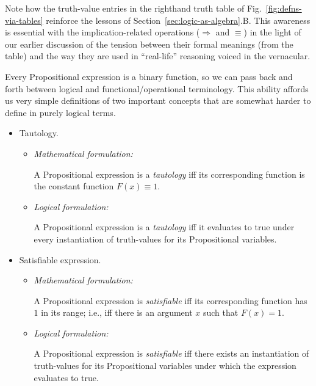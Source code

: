 Note how the truth-value entries in the righthand truth table of Fig.~\ref{fig:defns-via-tables} reinforce the lessons of Section~\ref{sec:logic-as-algebra}.B.  This awareness is essential with the implication-related operations ($\Rightarrow$ and $\equiv$) in the light of our earlier discussion of the tension between their formal meanings (from the table) and the way they are
used in ``real-life'' reasoning voiced in the vernacular.

\medskip

 
Every Propositional expression is a binary function, so we can pass back and forth between logical and functional/operational terminology.  This ability affords us very simple definitions of two important concepts that are somewhat harder to define in purely logical terms.
\begin{itemize}
\item
{\sf Tautology}. 
  \begin{itemize}
  \item
{\it Mathematical formulation:}

\smallskip

A Propositional expression is a {\it tautology} iff its corresponding function is the constant function $F(x) \equiv 1$.
  \item
{\it Logical formulation:}

\smallskip

A Propositional expression is a {\it tautology} iff it evaluates to {\sc true} under every instantiation of truth-values for its Propositional variables.
  \end{itemize}
\item
{\sf Satisfiable expression}.
  \begin{itemize}
  \item
{\it Mathematical formulation:}

\smallskip

A Propositional expression is {\it satisfiable} iff its corresponding function has $1$ in its range; i.e., iff there is an argument $x$ such that $F(x) = 1$.
  \item
{\it Logical formulation:}

\smallskip

A Propositional expression is {\it satisfiable} iff there exists an instantiation of truth-values for its Propositional variables under which the expression evaluates to {\sc true}.
  \end{itemize}
\end{itemize}

